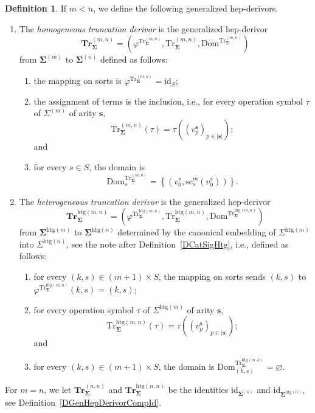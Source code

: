 \documentclass[a4paper, reqno]{amsbook}
\newcommand{\bb}[1]{\ensuremath{\lvert #1 \rvert}}
\newcommand{\sig}[1]{\mathbf{#1}}             %
\newcommand{\Dom}{\mathrm{Dom}}
\newcommand{\htg}{\mathrm{htg}}                %
\newcommand{\id}{\mathrm{id}}
\newcommand{\src}{\mathrm{sc}}
\newcommand{\Tr}{\mathrm{Tr}}
\newcommand{\bTr}{\mathbf{Tr}}
\theoremstyle{plain}
\theoremstyle{definition}
\newtheorem{definition}[theorem]{Definition}
\begin{document}
\begin{definition}\label{DTrDerivor}
If $m<n$, we define the following generalized hep-derivors.
\begin{enumerate}
\item The \emph{homogeneous truncation derivor} is the generalized hep-derivor
$$
\bTr^{(m,n)}_{\sig{\Sigma}}=\left(\varphi^{\Tr^{(m,n)}_{\sig{\Sigma}}},\Tr^{(m,n)}_{\sig{\Sigma}},\Dom^{\Tr^{(m,n)}_{\sig{\Sigma}}}\right)
$$
from $\sig{\Sigma}^{(m)}$ to $\sig{\Sigma}^{(n)}$ defined as follows:
\begin{enumerate}
\item the mapping on sorts is $\varphi^{\Tr^{(m,n)}_{\sig{\Sigma}}}=\id_{S}$;
\item the assignment of terms is the inclusion, i.e., for every operation symbol $\tau$ of $\Sigma^{(m)}$ of arity $\mathbf{s}$,
$$
\Tr^{(m,n)}_{\sig{\Sigma}}(\tau)=\tau((v^{\mathbf{s}}_{p})_{p\in\bb{\mathbf{s}}});
$$
and
\item for every $s\in S$, the domain is
$$
\Dom^{\Tr^{(m,n)}_{\sig{\Sigma}}}_{s}=\left\lbrace\left(v^{s}_{0},\src^{m}_{s}(v^{s}_{0})\right)\right\rbrace.
$$
\end{enumerate}
\item The \emph{heterogeneous truncation derivor} is the generalized hep-derivor
$$
\bTr^{\htg(m,n)}_{\sig{\Sigma}}=\left(\varphi^{\Tr^{\htg(m,n)}_{\sig{\Sigma}}},\Tr^{\htg(m,n)}_{\sig{\Sigma}},\Dom^{\Tr^{\htg(m,n)}_{\sig{\Sigma}}}\right)
$$
from $\sig{\Sigma}^{\htg(m)}$ to $\sig{\Sigma}^{\htg(n)}$ determined by the canonical embedding of $\Sigma^{\htg(m)}$ into $\Sigma^{\htg(n)}$, see the note after Definition~\ref{DCatSigHtg}, i.e., defined as follows:
\begin{enumerate}
\item for every $(k,s)\in(m+1)\times S$, the mapping on sorts sends $(k,s)$ to $\varphi^{\Tr^{\htg(m,n)}_{\sig{\Sigma}}}(k,s)=(k,s)$;
\item for every operation symbol $\tau$ of $\Sigma^{\htg(m)}$ of arity $\mathbf{s}$,
$$
\Tr^{\htg(m,n)}_{\sig{\Sigma}}(\tau)=\tau((v^{\mathbf{s}}_{p})_{p\in\bb{\mathbf{s}}});
$$
and
\item for every $(k,s)\in(m+1)\times S$, the domain is $\Dom^{\Tr^{\htg(m,n)}_{\sig{\Sigma}}}_{(k,s)}=\varnothing$.
\end{enumerate}
\end{enumerate}
For $m=n$, we let $\bTr^{(n,n)}_{\sig{\Sigma}}$ and $\bTr^{\htg(n,n)}_{\sig{\Sigma}}$ be the identities $\id_{\sig{\Sigma}^{(n)}}$ and $\id_{\sig{\Sigma}^{\htg(n)}}$, see Definition~\ref{DGenHepDerivorCompId}.
\end{definition}
\end{document}
